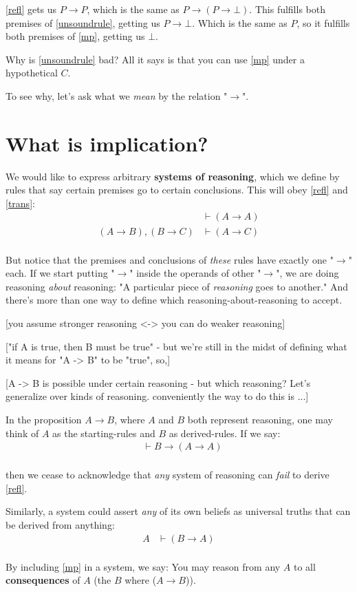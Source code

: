\documentclass{article}
\begin{document}
  \eqref{refl} gets us $P \to P$, which is the same as $P \to (P \to \bot)$.
  This fulfills both premises of \eqref{unsoundrule}, getting us $P \to \bot$.
  Which is the same as $P$, so it fulfills both premises of \eqref{mp}, getting us $\bot$.

  Why is \eqref{unsoundrule} bad? All it says is that you can use \eqref{mp} under a hypothetical $C$.
  
  To see why, let's ask what we \emph{mean} by the relation "$\to$".

  \section{What is implication?}

  We would like to express arbitrary \textbf{systems of reasoning}, which we define by rules that say certain premises go to certain conclusions. This will obey \eqref{refl} and \eqref{trans}:
  \begin{align*}
    \tag{reflexivity}
    &\vdash (A \to A) \\
    \label{trans}
    \tag{transitivity}
    (A \to B), (B \to C) &\vdash (A \to C) \\
  \end{align*}

  But notice that the premises and conclusions of \emph{these} rules have exactly one "$\to$" each.
  If we start putting "$\to$" inside the operands of other "$\to$", we are doing reasoning \emph{about} reasoning: "A particular piece of \emph{reasoning} goes to another."
  And there's more than one way to define which reasoning-about-reasoning to accept.

  [you assume stronger reasoning <-> you can do weaker reasoning]

  ["if A is true, then B must be true" - but we're still in the midst of defining what it means for "A -> B" to be "true", so,]

  [A -> B is possible under certain reasoning - but which reasoning? Let's generalize over kinds of reasoning. conveniently the way to do this is ...]

  In the proposition $A \to B$, where $A$ and $B$ both represent reasoning, one may think of $A$ as the starting-rules and $B$ as derived-rules. If we say:
  \begin{align*}
    \tag{derive reflexivity}
    &\vdash B \to (A \to A) \\
  \end{align*}

  then we cease to acknowledge that \emph{any} system of reasoning can \emph{fail} to derive \eqref{refl}.

  Similarly, a system could assert \emph{any} of its own beliefs as universal truths that can be derived from anything:
  \begin{align*}
    \tag{weakening}
    A &\vdash (B \to A) \\
  \end{align*}

  By including \eqref{mp} in a system, we say: You may reason from any $A$ to all \textbf{consequences} of $A$ (the $B$ where ($A \to B$)).


\end{document}
